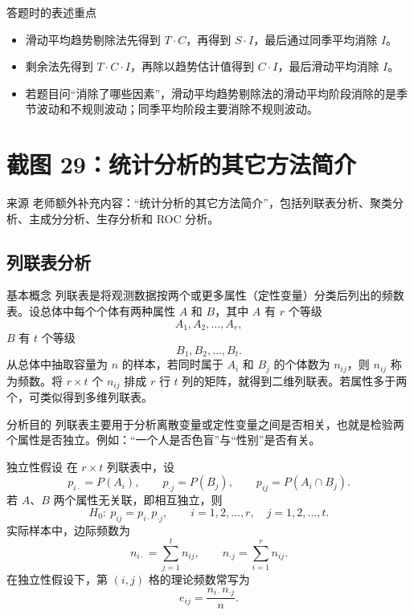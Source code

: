 \documentclass[UTF8,zihao=-4,fontset=fandol]{ctexart}
\begin{document}
\begin{warnbox}{答题时的表述重点}
\begin{itemize}
  \item 滑动平均趋势剔除法先得到 $T\cdot C$，再得到 $S\cdot I$，最后通过同季平均消除 $I$。
  \item 剩余法先得到 $T\cdot C\cdot I$，再除以趋势估计值得到 $C\cdot I$，最后滑动平均消除 $I$。
  \item 若题目问“消除了哪些因素”，滑动平均趋势剔除法的滑动平均阶段消除的是季节波动和不规则波动；同季平均阶段主要消除不规则波动。
\end{itemize}
\end{warnbox}

\section{截图 29：统计分析的其它方法简介}

\begin{sourcebox}{来源}
老师额外补充内容：“统计分析的其它方法简介”，包括列联表分析、聚类分析、主成分分析、生存分析和 ROC 分析。
\end{sourcebox}

\subsection{列联表分析}

\begin{keybox}{基本概念}
列联表是将观测数据按两个或更多属性（定性变量）分类后列出的频数表。设总体中每个个体有两种属性 $A$ 和 $B$，其中 $A$ 有 $r$ 个等级
\[
A_1,A_2,\ldots,A_r,
\]
$B$ 有 $t$ 个等级
\[
B_1,B_2,\ldots,B_t.
\]
从总体中抽取容量为 $n$ 的样本，若同时属于 $A_i$ 和 $B_j$ 的个体数为 $n_{ij}$，则 $n_{ij}$ 称为频数。将 $r\times t$ 个 $n_{ij}$ 排成 $r$ 行 $t$ 列的矩阵，就得到二维列联表。若属性多于两个，可类似得到多维列联表。
\end{keybox}

\begin{methodbox}{分析目的}
列联表主要用于分析离散变量或定性变量之间是否相关，也就是检验两个属性是否独立。例如：“一个人是否色盲”与“性别”是否有关。
\end{methodbox}

\begin{keybox}{独立性假设}
在 $r\times t$ 列联表中，设
\[
p_{i\cdot}=P(A_i),\qquad p_{\cdot j}=P(B_j),\qquad p_{ij}=P(A_i\cap B_j).
\]
若 $A$、$B$ 两个属性无关联，即相互独立，则
\[
H_0:\ p_{ij}=p_{i\cdot}p_{\cdot j},
\qquad i=1,2,\ldots,r,\quad j=1,2,\ldots,t.
\]
实际样本中，边际频数为
\[
n_{i\cdot}=\sum_{j=1}^{t}n_{ij},\qquad
n_{\cdot j}=\sum_{i=1}^{r}n_{ij}.
\]
在独立性假设下，第 $(i,j)$ 格的理论频数常写为
\[
e_{ij}=\frac{n_{i\cdot}n_{\cdot j}}{n}.
\]
\end{keybox}
\end{document}
